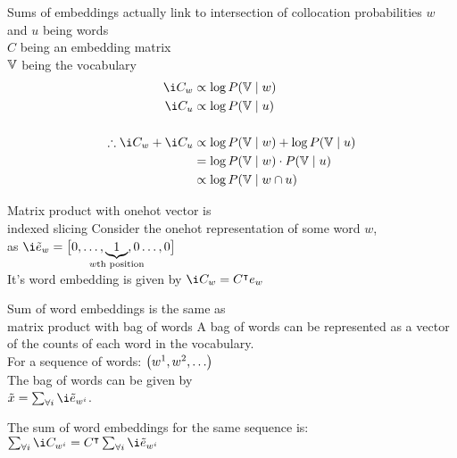 \documentclass[dvipsnames]{beamer}
\renewcommand{\emph}{\alert}
\begin{document}
\begin{frame}{Sums of embeddings actually link to intersection of collocation probabilities}
$w$ and $u$ being words\\
$C$ being an embedding matrix\\
$\mathbb{V}$ being the vocabulary\\
\begin{align*}\
\i C_w &\propto \log P(\set V \mid w)\\
\i C_u &\propto \log P(\set V \mid u)\\[0.5cm]
%
\therefore \i C_w + \i C_u &\propto \log P(\set V \mid w) + \log P(\set V \mid u) \\
&= \log P(\set V \mid w) \cdot P(\set V \mid u)\\
&\propto  \log P(\set V \mid w \cap u)
\end{align*}

\end{frame}


\begin{frame}{Matrix product with onehot vector is\\ indexed slicing}
	Consider the \emph{onehot} representation of some word $w$,\\
	as $\iv e_w=\big[0, \ldots, \underbrace{1}_{\mathclap{w\text{th position}}},0 \ldots, 0\big]$\\
	\vspace{0.5cm}
	It's word embedding is given by
	$\i C_{w} = C^\intercal e_w$
\end{frame}



\begin{frame}{Sum of word embeddings is the same as \\ matrix product with bag of words}
	A bag of words can be represented as a vector of the counts of each word in the vocabulary.\\ \vspace{0.5cm}
	For a sequence of words: $\left(\n w_1, \n w_2, \ldots \right)$ \\\vspace{0.5cm}
	The\emph{ bag of words} can be given by\\ $\v x = \sum_{\forall i} \iv e_{\n w_i}$.\\\vspace{0.5cm}
	
	The \emph{sum of word embeddings} for the same sequence is:
	$\sum_{\forall i} \i C_{\n w_i} = C^\intercal \sum_{\forall i} \iv e_{\n w_i}$
\end{frame}
\end{document}
